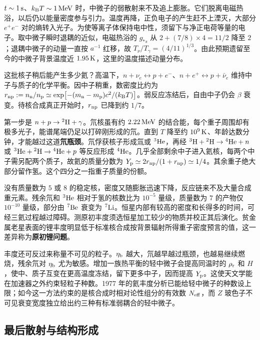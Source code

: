 $t\sim1\,{\rm s}$、$k_{\rm B}T\sim1\,{\rm MeV}$ 时，中微子的弱散射来不及追上膨胀。它们脱离电磁热浴，以后仍以能量密度参与引力。温度再降，正负电子的产生赶不上湮灭，大部分 $e^+e^-$ 对的熵转入光子。为使等离子体保持电中性，须留下与净正电荷等量的电子。取中微子瞬时退耦的近似，电磁热浴的 $g_{*s}$ 从 $2+(7/8)\times4=11/2$ 降至 $2$；退耦中微子的动量一直按 $a^{-1}$ 红移，故 $T_\nu/T_\gamma=(4/11)^{1/3}$。由此预期遗留至今的中微子背景温度近 $1.95\,{\rm K}$，这里的温度描述动量分布。

这批核子稍后能产生多少氦？高温下，$n+\nu_e\leftrightarrow p+e^-$、$n+e^+\leftrightarrow p+\bar\nu_e$ 维持中子与质子的化学平衡。因中子稍重，数密度比约为 $r_{\rm np}:=n_{\rm n}/n_{\rm p}\simeq\exp[-(m_{\rm n}-m_{\rm p})c^2/(k_{\rm B}T)]$。弱反应冻结后，自由中子仍会 $\beta$ 衰变。待核合成真正开始时，$r_{\rm np}$ 已降到约 $1/7$。

第一步是 $n+p\to{}^2{\rm H}+\gamma$。氘核虽有约 $2.22\,{\rm MeV}$ 的结合能，每个重子周围却有极多光子，能谱尾端仍足以打碎刚形成的氘。直到 $T$ 降至约 $10^9\,{\rm K}$、年龄达数分钟，才能越过这道\textbf{氘瓶颈}。氘俘获核子形成氚或 $^3{\rm He}$，再经 $^3{\rm H}+{}^2{\rm H}\to{}^4{\rm He}+n$ 或 $^3{\rm He}+{}^2{\rm H}\to{}^4{\rm He}+p$ 等反应形成 $^4{\rm He}$。几乎全部剩余中子进入氦核，每两个中子需另配两个质子，故氦的质量分数为 $Y_{\rm p}\simeq2r_{\rm np}/(1+r_{\rm np})\simeq1/4$。其余重子绝大部分留作氢。这个四分之一指重子质量的份额。

没有质量数为 $5$ 或 $8$ 的稳定核，密度又随膨胀迅速下降，反应链来不及大量合成重元素。残余氘和 $^3{\rm He}$ 相对于氢的核数比为 $10^{-5}$ 量级，质量数为 $7$ 的产物仅 $10^{-10}$ 量级，部分由 $^7{\rm Be}$ 衰变为 $^7{\rm Li}$。恒星内部有较高的密度和长得多的时间，可经三氦过程越过障碍。测原初丰度须选恒星加工较少的物质并校正其后演化。贫金属老星表面的锂丰度明显低于标准核合成按背景辐射所得重子密度预言的值，这一差异称为\textbf{原初锂问题}。

丰度还可反过来称量不可见的粒子。$\eta_{\rm b}$ 越大，氘越早越过瓶颈，也越易继续燃烧，残余氘对 $\eta_{\rm b}$ 尤为敏感。增加一族热平衡的轻中微子会提高同温时的 $\rho_{\rm r}$ 和 $H$，使中、质子互变在更高温度冻结，留下更多中子，因而提高 $Y_{\rm p}$。这使天文学能在加速器之外约束轻粒子种数。1977 年的氦丰度分析已能给轻中微子的种数设上限；如今这一方法约束的是核合成时相对论性组分的有效数 $N_{\rm eff}$，而 $Z$ 玻色子不可见衰变宽度独立给出约三种有标准弱耦合的轻中微子。

\subsection{最后散射与结构形成}\label{sec:cosmo-cmb}

